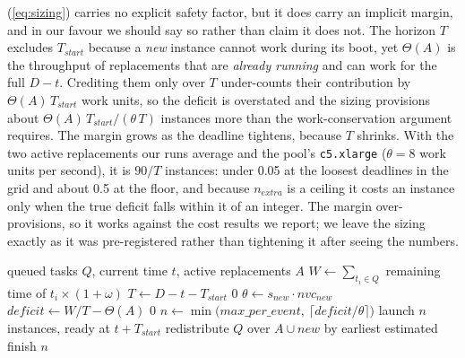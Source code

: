\documentclass[conference]{IEEEtran}
\begin{document}
(\ref{eq:sizing}) carries no explicit safety factor, but it does carry an
implicit margin, and in our favour we should say so rather than claim it does
not. The horizon $T$ excludes $T_{\mathit{start}}$ because a \emph{new}
instance cannot work during its boot, yet $\Theta(A)$ is the throughput of
replacements that are \emph{already running} and can work for the full
$D - t$. Crediting them only over $T$ under-counts their contribution by
$\Theta(A)\,T_{\mathit{start}}$ work units, so the deficit is overstated and
the sizing provisions about
$\Theta(A)\,T_{\mathit{start}} / (\theta\,T)$ instances more than the
work-conservation argument requires. The margin grows as the deadline
tightens, because $T$ shrinks. With the two active replacements our runs
average and the pool's \texttt{c5.xlarge} ($\theta = 8$ work units per
second), it is $90/T$ instances: under 0.05 at the loosest deadlines in the
grid and about 0.5 at the floor, and because $n_{\mathit{extra}}$ is a ceiling
it costs an instance only when the true deficit falls within it of an integer.
The margin over-provisions, so it works against the cost results we report; we
leave the sizing exactly as it was pre-registered rather than tightening it
after seeing the numbers.

\begin{algorithm}[t]
\caption{\textsc{DeadlineAwareProvision} (Theorem 2). \textbf{This work.}}
\label{alg:sizing}
\begin{algorithmic}[1]
\REQUIRE queued tasks $Q$, current time $t$, active replacements $A$
\STATE $W \leftarrow \sum_{t_i \in Q}$ remaining time of $t_i \times (1+\omega)$
\STATE $T \leftarrow D - t - T_{\mathit{start}}$
 \RETURN $0$ \ENDIF
\STATE $\theta \leftarrow s_{\mathit{new}}\cdot \mathit{nvc}_{\mathit{new}}$
\STATE $\mathit{deficit} \leftarrow W/T - \Theta(A)$
 \RETURN $0$ \ENDIF
\STATE $n \leftarrow \min\!\big(\mathit{max\_per\_event},\ \lceil \mathit{deficit}/\theta \rceil\big)$
\STATE launch $n$ instances, ready at $t + T_{\mathit{start}}$
\STATE redistribute $Q$ over $A \cup \mathit{new}$ by earliest estimated finish
\RETURN $n$
\end{algorithmic}
\end{algorithm}
\end{document}
